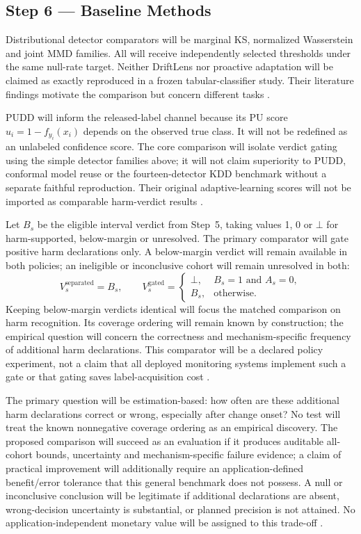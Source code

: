 \subsection*{Step 6 --- Baseline Methods}
Distributional detector comparators will be marginal KS, normalized Wasserstein and joint MMD families. All will receive independently selected thresholds under the same null-rate target. Neither DriftLens nor proactive adaptation will be claimed as exactly reproduced in a frozen tabular-classifier study. Their literature findings motivate the comparison but concern different tasks \cite{greco,szucs,guerrero}.

PUDD will inform the released-label channel because its PU score $u_i=1-f_{y_i}(x_i)$ depends on the observed true class. It will not be redefined as an unlabeled confidence score. The core comparison will isolate verdict gating using the simple detector families above; it will not claim superiority to PUDD, conformal model reuse or the fourteen-detector KDD benchmark without a separate faithful reproduction. Their original adaptive-learning scores will not be imported as comparable harm-verdict results \cite{pudd,conformal,cerqueira}.

Let $B_s$ be the eligible interval verdict from Step~5, taking values 1, 0 or $\bot$ for harm-supported, below-margin or unresolved. The primary comparator will gate positive harm declarations only. A below-margin verdict will remain available in both policies; an ineligible or inconclusive cohort will remain unresolved in both:
\begin{equation}
V_s^{\mathrm{separated}}=B_s,\qquad
V_s^{\mathrm{gated}}=
\begin{cases}\bot,& B_s=1\text{ and }A_s=0,\\ B_s,&\text{otherwise}.\end{cases}
\end{equation}
Keeping below-margin verdicts identical will focus the matched comparison on harm recognition. Its coverage ordering will remain known by construction; the empirical question will concern the correctness and mechanism-specific frequency of additional harm declarations. This comparator will be a declared policy experiment, not a claim that all deployed monitoring systems implement such a gate or that gating saves label-acquisition cost \cite{alencar,solozobov}.

The primary question will be estimation-based: how often are these additional harm declarations correct or wrong, especially after change onset? No test will treat the known nonnegative coverage ordering as an empirical discovery. The proposed comparison will succeed as an evaluation if it produces auditable all-cohort bounds, uncertainty and mechanism-specific failure evidence; a claim of practical improvement will additionally require an application-defined benefit/error tolerance that this general benchmark does not possess. A null or inconclusive conclusion will be legitimate if additional declarations are absent, wrong-decision uncertainty is substantial, or planned precision is not attained. No application-independent monetary value will be assigned to this trade-off \cite{window,pudd,selective,nist}.

